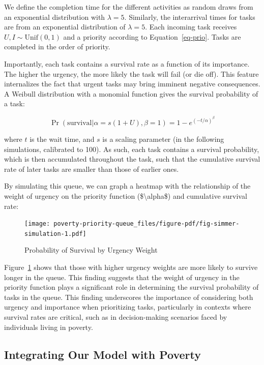 \documentclass[
]{article}
\begin{document}
We define the completion time for the different activities as random
draws from an exponential distribution with \(\lambda = 5\). Similarly,
the interarrival times for tasks are from an exponential distribution of
\(\lambda = 5\). Each incoming task receives
\(U, I \sim \text{Unif}(0,1)\) and a priority according to
Equation~\ref{eq-prio}. Tasks are completed in the order of priority.

Importantly, each task contains a survival rate as a function of its
importance. The higher the urgency, the more likely the task will fail
(or die off). This feature internalizes the fact that urgent tasks may
bring imminent negative consequences. A Weibull distribution with a
monomial function gives the survival probability of a task:

\[
\Pr (\text{survival}|\alpha = s(1+U),\beta=1) = 1 - e^{(-t/\alpha)^\beta}
\]

where \(t\) is the wait time, and \(s\) is a scaling parameter (in the
following simulations, calibrated to 100). As such, each task contains a
survival probability, which is then accumulated throughout the task,
such that the cumulative survival rate of later tasks are smaller than
those of earlier ones.

By simulating this queue, we can graph a heatmap with the relationship
of the weight of urgency on the priority function
(\$\textbackslash alpha\$) and cumulative survival rate:

\begin{figure}

{\centering \texttt{[image: poverty-priority-queue\_files/figure-pdf/fig-simmer-simulation-1.pdf]}

}

\caption{\label{fig-simmer-simulation}Probability of Survival by Urgency
Weight}

\end{figure}

Figure~\ref{fig-simmer-simulation} shows that those with higher urgency
weights are more likely to survive longer in the queue. This finding
suggests that the weight of urgency in the priority function plays a
significant role in determining the survival probability of tasks in the
queue. This finding underscores the importance of considering both
urgency and importance when prioritizing tasks, particularly in contexts
where survival rates are critical, such as in decision-making scenarios
faced by individuals living in poverty.

\hypertarget{sec-poverty}{%
\subsection{Integrating Our Model with Poverty}\label{sec-poverty}}
\end{document}
